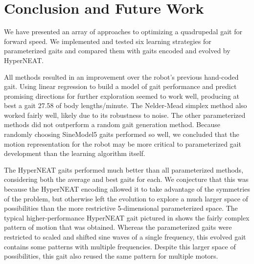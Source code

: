 \section{Conclusion and Future Work}

We have presented an array of approaches to optimizing a quadrupedal
gait for forward speed.  We implemented and tested six learning
strategies for parameterized gaits and compared them with gaits
encoded and evolved by HyperNEAT.

All methods resulted in an improvement over the robot's previous
hand-coded gait.  Using linear regression to build a model of gait
performance and predict promising directions for further exploration
seemed to work well, producing at best a gait 27.58 of body
lengths/minute.  The Nelder-Mead simplex method also worked fairly
well, likely due to its robustness to noise.  The other parameterized
methods did not outperform a random gait generation method.  Because
randomly choosing SineModel5 gaits performed so well, we concluded
that the motion representation for the robot may be more critical to
parameterized gait development than the learning algorithm itself.

The HyperNEAT gaits performed much better than all parameterized
methods, considering both the average and best gaits for each.  We
conjecture that this was because the HyperNEAT encoding allowed it to
take advantage of the symmetries of the problem, but otherwise left
the evolution to explore a much larger space of possibilities than the
more restrictive 5-dimensional parameterized space.  The typical
higher-performance HyperNEAT gait pictured in
 shows the fairly
complex pattern of motion that was obtained.  Whereas the
parameterized gaits were restricted to scaled and shifted sine waves
of a single frequency, this evolved gait contains some patterns with
multiple frequencies.  Despite this larger space of possibilities,
this gait also reused the same pattern for multiple motors.

